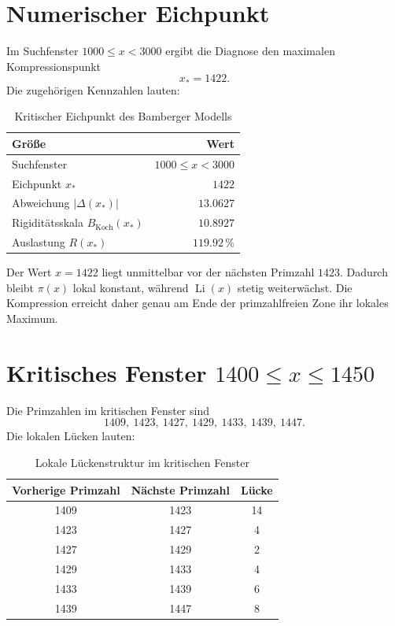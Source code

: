 \documentclass[11pt,a4paper]{article}
\newcommand{\Li}{\operatorname{Li}}
\newcommand{\piPrime}{\pi}
\newcommand{\Deviation}{\Delta}
\newcommand{\Koch}{B_{\mathrm{Koch}}}
\begin{document}
\section{Numerischer Eichpunkt}

Im Suchfenster \(1000\leq x<3000\) ergibt die Diagnose den maximalen
Kompressionspunkt
\[
  x_\ast=1422.
\]
Die zugehörigen Kennzahlen lauten:

\begin{table}[htbp]
\centering
\caption{Kritischer Eichpunkt des Bamberger Modells}
\begin{tabular}{@{}lr@{}}
\toprule
Größe & Wert \\
\midrule
Suchfenster & \(1000 \leq x < 3000\) \\
Eichpunkt \(x_\ast\) & \(1422\) \\
Abweichung \(|\Deviation(x_\ast)|\) & \(\num{13.0627}\) \\
Rigiditätsskala \(\Koch(x_\ast)\) & \(\num{10.8927}\) \\
Auslastung \(R(x_\ast)\) & \(\num{119.92}\,\%\) \\
\bottomrule
\end{tabular}
\end{table}

Der Wert \(x=1422\) liegt unmittelbar vor der nächsten Primzahl \(1423\).
Dadurch bleibt \(\piPrime(x)\) lokal konstant, während \(\Li(x)\) stetig
weiterwächst. Die Kompression erreicht daher genau am Ende der primzahlfreien
Zone ihr lokales Maximum.

\section[Kritisches Fenster 1400 bis 1450]{Kritisches Fenster \(1400\leq x\leq 1450\)}

Die Primzahlen im kritischen Fenster sind
\[
  1409,\ 1423,\ 1427,\ 1429,\ 1433,\ 1439,\ 1447.
\]
Die lokalen Lücken lauten:

\begin{table}[htbp]
\centering
\caption{Lokale Lückenstruktur im kritischen Fenster}
\begin{tabular}{@{}ccc@{}}
\toprule
Vorherige Primzahl & Nächste Primzahl & Lücke \\
\midrule
1409 & 1423 & 14 \\
1423 & 1427 & 4 \\
1427 & 1429 & 2 \\
1429 & 1433 & 4 \\
1433 & 1439 & 6 \\
1439 & 1447 & 8 \\
\bottomrule
\end{tabular}
\end{table}
\end{document}
